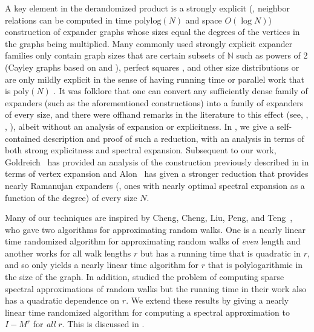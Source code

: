 \documentclass{toc}
\newcommand{\poly}{\mathrm{poly}}
\newcommand{\polylog}{\mathrm{polylog}}
\numberwithin{myalgctr}{section}
\theoremstyle{named}
\begin{document}
A key element in the derandomized product is a strongly explicit (\ie, neighbor relations can be computed in time $\polylog (N)$ and space $O(\log N)$) construction of expander graphs whose sizes equal the degrees of the vertices in the graphs being multiplied. Many commonly used strongly explicit expander families only contain graph sizes that are certain subsets of $\mathbb{N}$ such as powers of 2 (Cayley graphs based on \cite{NaorNa93} and \cite{AlonGoHaPe92}), perfect squares \cite{Margulis73, GabberGa81}, and other size distributions \cite{ReingoldVaWi01} or are only mildly explicit in the sense of having running time or parallel work that is $\poly(N)$ \cite{LeePS15}.  It was folklore that one can convert any sufficiently dense family of expanders (such as the aforementioned constructions) into a family of expanders of every size, and there were offhand remarks in the literature to this effect  %
(see, \eg,
\cite{alon2008elementary}, \cite{goldreich08}), albeit without an analysis of expansion or explicitness. In , we give a self-contained description and proof of such a reduction, with an analysis in terms of both strong explicitness and spectral expansion. Subsequent to our work, Goldreich~\cite{gnote} has provided an analysis of the construction previously described in \cite{goldreich08} in terms of vertex expansion and Alon~\cite{alon_inprep} has given a stronger reduction that provides nearly Ramanujan expanders (\ie, ones with nearly optimal spectral expansion as a function of the degree) of every size $N$. 

Many of our techniques are inspired by Cheng, Cheng, Liu, Peng, and Teng~\cite{cheng2015}, who gave two algorithms for approximating random walks. One is a nearly linear time randomized algorithm for approximating random walks of \emph{even} length and another works for all walk lengths $r$ but has a running time that is quadratic in $r$, and so only yields a nearly linear time algorithm for $r$ that is polylogarithmic in the size of the graph. In addition, \cite{JKPS17} studied the problem of computing sparse spectral approximations of random walks but the running time in their work also has a quadratic dependence on $r$. We extend these results by giving a nearly linear time randomized algorithm for computing a spectral approximation to $I-M^r$ for \emph{all} $r$. This is discussed in . 

%
\iffalse
\end{document}
